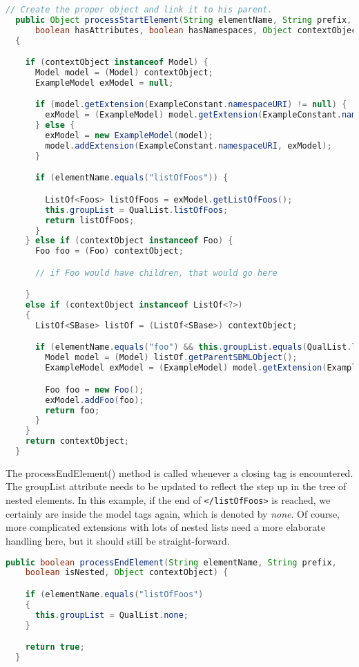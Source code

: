 \begin{lstlisting}[language=Java,caption={Extension parser: \texttt{processStartElement()}},label={lst:ModelExtParserStartElement}]
  // Create the proper object and link it to his parent.
  public Object processStartElement(String elementName, String prefix,
      boolean hasAttributes, boolean hasNamespaces, Object contextObject)
  {

    if (contextObject instanceof Model) {
      Model model = (Model) contextObject;
      ExampleModel exModel = null;

      if (model.getExtension(ExampleConstant.namespaceURI) != null) {
        exModel = (ExampleModel) model.getExtension(ExampleConstant.namespaceURI);
      } else {
        exModel = new ExampleModel(model);
        model.addExtension(ExampleConstant.namespaceURI, exModel);
      }

      if (elementName.equals("listOfFoos")) {

        ListOf<Foos> listOfFoos = exModel.getListOfFoos();
        this.groupList = QualList.listOfFoos;
        return listOfFoos;
      }
    } else if (contextObject instanceof Foo) {
      Foo foo = (Foo) contextObject;

      // if Foo would have children, that would go here

    }
    else if (contextObject instanceof ListOf<?>)
    {
      ListOf<SBase> listOf = (ListOf<SBase>) contextObject;

      if (elementName.equals("foo") && this.groupList.equals(QualList.listOfFoos)) {
        Model model = (Model) listOf.getParentSBMLObject();
        ExampleModel exModel = (ExampleModel) model.getExtension(ExampleConstant.namespaceURI);

        Foo foo = new Foo();
        exModel.addFoo(foo);
        return foo;
      }
    }
    return contextObject;
  }
\end{lstlisting}

The processEndElement() method is called whenever a closing tag is encountered.
The groupList attribute needs to be updated to reflect the step up in the tree of nested elements.
In this example, if the end of \texttt{</listOfFoos>} is reached, we certainly are inside the model tags again, which is denoted by \emph{none}.
Of course, more complicated extensions with lots of nested lists need a more elaborate handling here, but it should still be straight-forward.

\begin{lstlisting}[language=Java,caption={Extension parser:
\texttt{processEndElement()}},label={lst:ModelExtParserEndElement}]
  public boolean processEndElement(String elementName, String prefix,
    boolean isNested, Object contextObject) {

    if (elementName.equals("listOfFoos")
    {
      this.groupList = QualList.none;
    }

    return true;
  }
\end{lstlisting}

